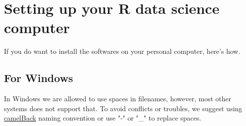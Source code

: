\documentclass[11pt]{article} %
\begin{document}
  

\pagebreak


\section{Setting up your R data science computer}
  If you do want to install the softwares on your personal computer, here's how.
  \subsection{For Windows}
    In Windows we are allowed to use spaces in filenames, however, most other systems does not support that. 
    To avoid conflicts or troubles, we suggest using \href{https://sanaulla.info/2008/06/25/camelcase-notation-naming-convention-for-programming-languages/}{camelBack} naming convention or use "-" or "\_" to replace spaces. 
    
\end{document}
